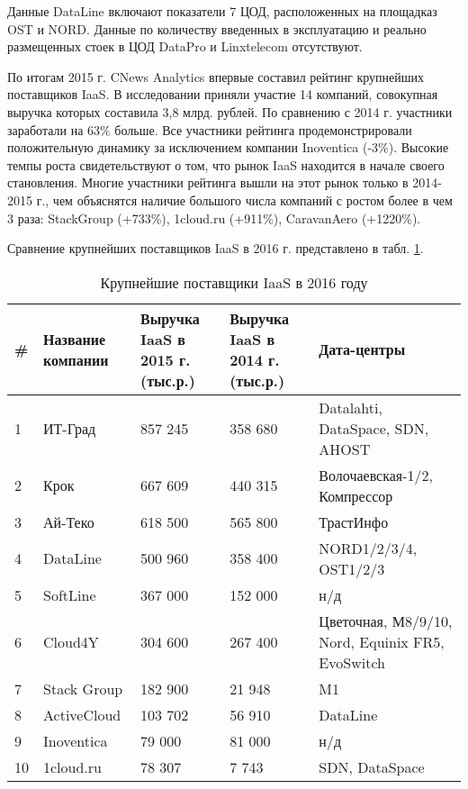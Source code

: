 Данные DataLine включают показатели 7 ЦОД, расположенных на площадказ OST и NORD.
Данные по количеству введенных в эксплуатацию и реально размещенных стоек в ЦОД DataPro и Linxtelecom отсутствуют.

По итогам 2015 г. CNews Analytics впервые составил рейтинг крупнейших поставщиков IaaS.
В исследовании приняли участие 14 компаний, совокупная выручка которых составила 3,8 млрд. рублей.
По сравнению с 2014 г. участники заработали на 63\% больше.
Все участники рейтинга продемонстрировали положительную динамику за исключением компании Inoventica (-3\%).
Высокие темпы роста свидетельствуют о том, что рынок IaaS находится в начале своего становления.
Многие участники рейтинга вышли на этот рынок только в 2014-2015 г., чем объяснятся наличие большого числа компаний с ростом более в чем 3 раза: StackGroup (+733\%), 1cloud.ru (+911\%), CaravanAero (+1220\%).

Сравнение крупнейших поставщиков IaaS в 2016 г. \cite{cnews} представлено в табл. \ref{iaas-table}.
\begin{table}[H]
  \caption{Крупнейшие поставщики IaaS в 2016 году}\label{iaas-table}
  \begin{tabular}{|p{0.5cm}|p{2.5cm}|p{3.5cm}|p{3.5cm}|p{4.5cm}|}
  \hline \# & Название компании & Выручка IaaS в 2015 г. (тыс.р.) & Выручка IaaS в 2014 г. (тыс.р.) & Дата-центры \\
  \hline 1 & ИТ-Град & 857 245 & 358 680 & Datalahti, DataSpace, SDN, AHOST \\
  \hline 2 & Крок & 667 609 & 440 315 & Волочаевская-1/2, Компрессор \\
  \hline 3 & Ай-Теко & 618 500 & 565 800 & ТрастИнфо \\
  \hline 4 & DataLine & 500 960 & 358 400 & NORD1/2/3/4, OST1/2/3 \\
  \hline 5 & SoftLine & 367 000 & 152 000 & н/д \\
  \hline 6 & Cloud4Y & 304 600 & 267 400 & Цветочная, М8/9/10, Nord, Equinix FR5, EvoSwitch \\
  \hline 7 & Stack Group & 182 900 & 21 948 & M1 \\
  \hline 8 & ActiveCloud & 103 702 & 56 910 & DataLine \\
  \hline 9 & Inoventica & 79 000 & 81 000 & н/д \\
  \hline 10 & 1cloud.ru & 78 307 & 7 743 & SDN, DataSpace \\
  \hline
  \end{tabular}
\end{table}


